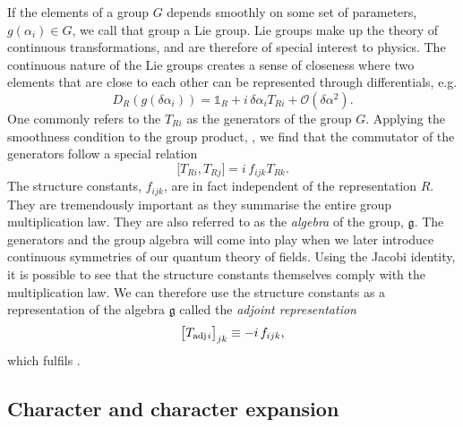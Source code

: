 If the elements of a group $G$ depends smoothly on some set of parameters,
$g(\alpha_i) \in G$, we call that group a Lie group. Lie groups make up the
theory of continuous transformations, and are therefore of special interest to
physics. The continuous nature of the Lie groups creates a sense of closeness
where two elements that are close to each other can be represented through
differentials, e.g.
%
\begin{equation}
  D_R(g(\delta\alpha_i)) = \mathbb{1}_R + i\, \delta \alpha_i T_{Ri} +
    \mathcal{O}(\delta \alpha^2).
\end{equation}
%
One commonly refers to the $T_{Ri}$ as the generators of the group $G$. Applying
the smoothness condition to the group product, ,
we find that the commutator of the generators follow a special relation
%
\begin{equation} \label{eq:group_algebra}
  \big[ T_{Ri}, T_{Rj} \big] = i\, f_{ijk} T_{Rk}.
\end{equation}
%
The structure constants, $f_{ijk}$, are in fact independent of the
representation $R$. They are tremendously important as they summarise the entire
group multiplication law. They are also referred to as the \emph{algebra} of the
group, $\mathfrak{g}$. The generators and the group algebra will come into play
when we later introduce continuous symmetries of our quantum theory of fields.
Using the Jacobi identity, it is possible to see that the structure constants
themselves comply with the multiplication law. We can therefore use the structure
constants as a representation of the algebra $\mathfrak{g}$ called the
\emph{adjoint representation}
%
\begin{equation}
  \big[ T_{\text{adj}\hskip.2ex i} \big]_{jk} \equiv -i\, f_{ijk},
\end{equation}
%
which fulfils .

\subsection{Character and character expansion}

